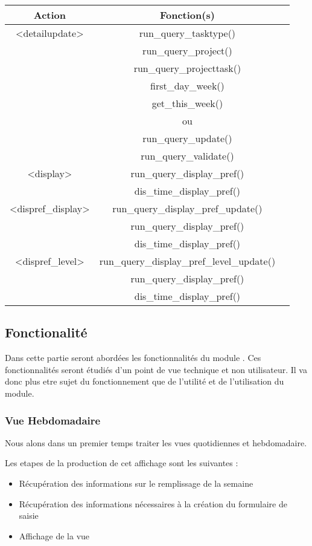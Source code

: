\begin{tabular}{|c|c|p{3cm}|}
 \hline
 \textbf{Action} & \textbf{Fonction(s)} \\
 \hline
 \hline
  <detailupdate> & run\_query\_tasktype()\\ 
                 & run\_query\_project() \\
                 & run\_query\_projecttask() \\
                 & first\_day\_week() \\
                 & get\_this\_week() \\
                 & ou \\
	         & run\_query\_update() \\
	         & run\_query\_validate() \\
 \hline
  <display> & run\_query\_display\_pref() \\
            & dis\_time\_display\_pref() \\
 \hline
  <dispref\_display> & run\_query\_display\_pref\_update() \\
                     & run\_query\_display\_pref() \\
                     & dis\_time\_display\_pref() \\
 \hline
  <dispref\_level> & run\_query\_display\_pref\_level\_update() \\
                   & run\_query\_display\_pref() \\
                   & dis\_time\_display\_pref() \\
 \hline 
\end{tabular}

\subsection{Fonctionalité}
 Dans cette partie seront abordées les fonctionnalités du module \project. Ces fonctionnalités seront étudiés d'un point de vue technique et non utilisateur. Il va donc plus etre sujet du fonctionnement que de l'utilité et de l'utilisation du module.

\subsubsection{Vue Hebdomadaire}

 Nous alons dans un premier temps traiter les vues quotidiennes et hebdomadaire.

 Les etapes de la production de cet affichage sont les suivantes : 
 \begin{itemize}
  \item{Récupération des informations sur le remplissage de la semaine}
  \item{Récupération des informations nécessaires à la création du formulaire de saisie}
  \item{Affichage de la vue}
 \end{itemize}

